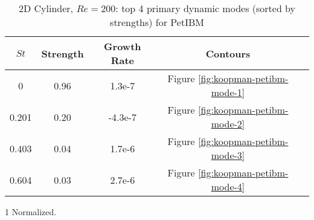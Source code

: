 \begin{table}[hbt!]
    \singlespacing
    \begin{threeparttable}[b]
        \begin{tabular}{ccccc}
            \toprule
            $St$ & Strength\tnote{1} & Growth Rate & Contours \\
            \midrule
            0     & 0.96 & 1.3e-7  & Figure \ref{fig:koopman-petibm-mode-1}\\
            0.201 & 0.20 & -4.3e-7 & Figure \ref{fig:koopman-petibm-mode-2}\\
            0.403 & 0.04 & 1.7e-6  & Figure \ref{fig:koopman-petibm-mode-3}\\
            0.604 & 0.03 & 2.7e-6  & Figure \ref{fig:koopman-petibm-mode-4}\\
            \bottomrule
        \end{tabular}%
        \begin{tablenotes}
            \footnotesize
            \item [1] Normalized.
        \end{tablenotes}
        \caption{%
            2D Cylinder, $Re=200$: top 4 primary dynamic modes (sorted by strengths) for PetIBM%
        }%
        \label{table:koopman-petibm}
    \end{threeparttable}
\end{table}%